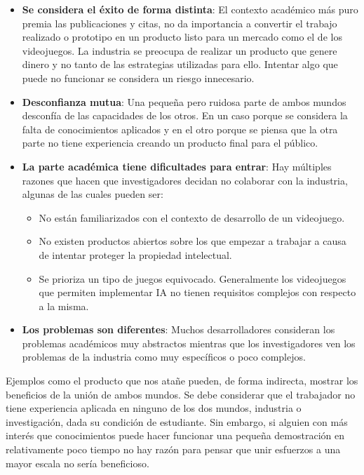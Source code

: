 \begin{itemize}
	\item \textbf{Se considera el éxito de forma distinta}: El contexto académico más puro premia las publicaciones y citas, no da importancia a convertir el trabajo realizado o prototipo en un producto listo para un mercado como el de los videojuegos. La industria se preocupa de realizar un producto que genere dinero y no tanto de las estrategias utilizadas para ello. Intentar algo que puede no funcionar se considera un riesgo innecesario.
	\item \textbf{Desconfianza mutua}: Una pequeña pero ruidosa parte de ambos mundos desconfía de las capacidades de los otros. En un caso porque se considera la falta de conocimientos aplicados y en el otro porque se piensa que la otra parte no tiene experiencia creando un producto final para el público.
	\item \textbf{La parte académica tiene dificultades para entrar}: Hay múltiples razones que hacen que investigadores decidan no colaborar con la industria, algunas de las cuales pueden ser:
		\begin{itemize}
			\item No están familiarizados con el contexto de desarrollo de un videojuego.
			\item No existen productos abiertos sobre los que empezar a trabajar a causa de intentar proteger la propiedad intelectual.
			\item Se prioriza un tipo de juegos equivocado. Generalmente los videojuegos que permiten implementar IA no tienen requisitos complejos con respecto a la misma.
		\end{itemize}
	\item \textbf{Los problemas son diferentes}: Muchos desarrolladores consideran los problemas académicos muy abstractos mientras que los investigadores ven los problemas de la industria como muy específicos o poco complejos.
\end{itemize}

\bigskip

Ejemplos como el producto que nos atañe pueden, de forma indirecta, mostrar los beneficios de la unión de ambos mundos. Se debe considerar que el trabajador no tiene experiencia aplicada en ninguno de los dos mundos, industria o investigación, dada su condición de estudiante. Sin embargo, si alguien con más interés que conocimientos puede hacer funcionar una pequeña demostración en relativamente poco tiempo no hay razón para pensar que unir esfuerzos a una mayor escala no sería beneficioso.
